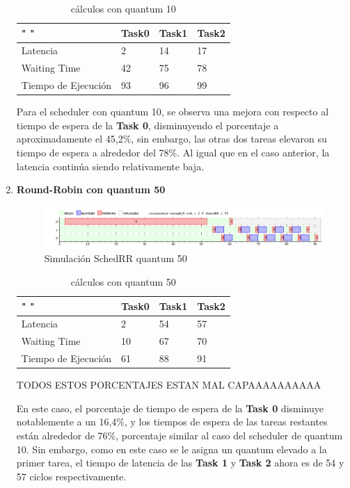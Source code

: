 \documentclass[11pt]{article}
\begin{document}
\begin{enumerate}
\begin{table}[htb]
\centering
\begin{tabular}{| l | l | l | l |}
\hline
" " & Task0 & Task1 & Task2 \\
\hline \hline
Latencia & 2 & 14 & 17 \\ \hline
Waiting Time & 42 & 75 & 78 \\ \hline
Tiempo de Ejecución & 93 & 96 & 99 \\ \hline
\end{tabular}
\caption{cálculos con quantum 10}
\end{table}

Para el scheduler con quantum 10, se observa una mejora con respecto al tiempo de espera de la \textbf{Task 0}, disminuyendo el porcentaje a aproximadamente el 45,2\%, sin embargo, las otras dos tareas elevaron su tiempo de espera a alrededor del 78\%. Al igual que en el caso anterior, la latencia continúa siendo relativamente baja.

\item \textbf{Round-Robin con quantum 50}

      \begin{figure}[H]
        \includegraphics[scale=0.5]{Ej5q50}
        \caption{Simulación SchedRR quantum 50}
      \end{figure}

\begin{table}[htb]
\centering
\begin{tabular}{| l | l | l | l |}
\hline
" " & Task0 & Task1 & Task2 \\
\hline \hline
Latencia & 2 & 54 & 57 \\ \hline
Waiting Time & 10 & 67 & 70 \\ \hline
Tiempo de Ejecución & 61 & 88 & 91 \\ \hline
\end{tabular}
\caption{cálculos con quantum 50}
\end{table}

TODOS ESTOS PORCENTAJES ESTAN MAL CAPAAAAAAAAAA

En este caso, el porcentaje de tiempo de espera de la \textbf{Task 0} disminuye notablemente a un 16,4\%, y los tiempos de espera de las tareas restantes están alrededor de 76\%, porcentaje similar al caso del scheduler de quantum 10. Sin embargo, como en este caso se le asigna un quantum elevado a la primer tarea, el tiempo de latencia de las \textbf{Task 1} y \textbf{Task 2} ahora es de 54 y 57 ciclos respectivamente. 
\end{enumerate}
\end{document}
